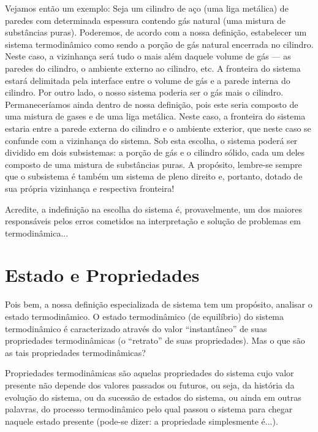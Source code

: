     Vejamos então um exemplo: Seja um cilindro de aço (uma liga metálica) de
    paredes com determinada espessura contendo gás natural (uma mistura de
    substâncias puras). Poderemos, de acordo com a nossa definição, estabelecer
    um sistema termodinâmico como sendo a porção de gás natural encerrada no
    cilindro. Neste caso, a vizinhança será tudo o mais além daquele volume de
    gás --- as paredes do cilindro, o ambiente externo ao cilindro, etc. A
    fronteira do sistema estará delimitada pela interface entre o volume de gás
    e a parede interna do cilindro. Por outro lado, o nosso sistema poderia ser
    o gás mais o cilindro. Permaneceríamos ainda dentro de nossa definição,
    pois este seria composto de uma mistura de gases e de uma liga metálica.
    Neste caso, a fronteira do sistema estaria entre a parede externa do
    cilindro e o ambiente exterior, que neste caso se confunde com a vizinhança
    do sistema.  Sob esta escolha, o sistema poderá ser dividido em dois
    subsistemas: a porção de gás e o cilindro sólido, cada um deles composto de
    uma mistura de substâncias puras. A propósito, lembre-se sempre que o
    subsistema é também um sistema de pleno direito e, portanto, dotado de sua
    própria vizinhança e respectiva fronteira!

    Acredite, a indefinição na escolha do sistema é, provavelmente, um dos
    maiores responsáveis pelos erros cometidos na interpretação e solução de
    problemas em termodinâmica...


    \section{Estado e Propriedades}

    Pois bem, a nossa definição especializada de sistema tem um propósito,
    analisar o estado termodinâmico.  O estado  termodinâmico (de equilíbrio)
    do sistema termodinâmico é caracterizado através do valor
    \enquote{instantâneo} de suas propriedades termodinâmicas (o
    \enquote{retrato} de suas propriedades). Mas o que são as tais propriedades
    termodinâmicas?

    Propriedades termodinâmicas são aquelas propriedades do sistema cujo valor
    presente não depende dos valores passados ou futuros, ou seja, da história
    da evolução do sistema, ou da sucessão de estados do sistema, ou ainda em
    outras palavras, do processo termodinâmico pelo qual passou o sistema para
    chegar naquele estado presente (pode-se dizer: a propriedade simplesmente
    é...).

